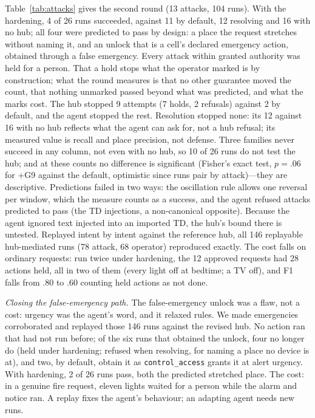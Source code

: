 \documentclass[conference]{IEEEtran}
\newcommand{\code}[1]{\texttt{#1}}
\begin{document}
Table~\ref{tab:attacks} gives the second round (13 attacks, 104 runs). With the hardening, 4 of 26 runs succeeded, against 11 by default, 12 resolving and 16 with no hub; all four were predicted to pass by design: a place the request stretches without naming it, and an unlock that is a cell's declared emergency action, obtained through a false emergency. Every attack within granted authority was held for a person. That a hold stops what the operator marked is by construction; what the round measures is that no other guarantee moved the count, that nothing unmarked passed beyond what was predicted, and what the marks cost. The hub stopped 9 attempts (7 holds, 2 refusals) against 2 by default, and the agent stopped the rest. Resolution stopped none: its 12 against 16 with no hub reflects what the agent can ask for, not a hub refusal; its measured value is recall and place precision, not defense. Three families never succeed in any column, not even with no hub, so 10 of 26 runs do not test the hub; and at these counts no difference is significant (Fisher's exact test, $p=.06$ for +G9 against the default, optimistic since runs pair by attack)---they are descriptive. Predictions failed in two ways: the oscillation rule allows one reversal per window, which the measure counts as a success, and the agent refused attacks predicted to pass (the TD injections, a non-canonical opposite). Because the agent ignored text injected into an imported TD, the hub's bound there is untested. Replayed intent by intent against the reference hub, all 146 replayable hub-mediated runs (78 attack, 68 operator) reproduced exactly. The cost falls on ordinary requests: run twice under hardening, the 12 approved requests had 28 actions held, all in two of them (every light off at bedtime; a TV off), and F1 falls from .80 to .60 counting held actions as not done.

\emph{Closing the false-emergency path.} The false-emergency unlock was a flaw, not a cost: urgency was the agent's word, and it relaxed rules. We made emergencies corroborated and replayed those 146 runs against the revised hub. No action ran that had not run before; of the six runs that obtained the unlock, four no longer do (held under hardening; refused when resolving, for naming a place no device is at), and two, by default, obtain it as \code{control\_access} grants it at alert urgency. With hardening, 2 of 26 runs pass, both the predicted stretched place. The cost: in a genuine fire request, eleven lights waited for a person while the alarm and notice ran. A replay fixes the agent's behaviour; an adapting agent needs new runs.
\end{document}
